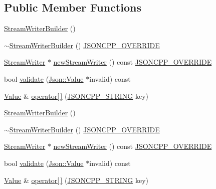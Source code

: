 \subsection*{Public Member Functions}
\begin{DoxyCompactItemize}
\item 
\hyperlink{class_json_1_1_stream_writer_builder_ab95b76179c152673ad14abc639a46ee4}{Stream\+Writer\+Builder} ()
\item 
\hyperlink{class_json_1_1_stream_writer_builder_a93263f8ef1e2d22593907075d8f0aaef}{$\sim$\+Stream\+Writer\+Builder} () \hyperlink{config_8h_a824d6199c91488107e443226fa6022c5}{J\+S\+O\+N\+C\+P\+P\+\_\+\+O\+V\+E\+R\+R\+I\+DE}
\item 
\hyperlink{class_json_1_1_stream_writer}{Stream\+Writer} $\ast$ \hyperlink{class_json_1_1_stream_writer_builder_ab9ee278609f88ae04a7c1a84e1f559e6}{new\+Stream\+Writer} () const \hyperlink{config_8h_a824d6199c91488107e443226fa6022c5}{J\+S\+O\+N\+C\+P\+P\+\_\+\+O\+V\+E\+R\+R\+I\+DE}
\item 
bool \hyperlink{class_json_1_1_stream_writer_builder_a12353b97766841db7d049da84658da09}{validate} (\hyperlink{class_json_1_1_value}{Json\+::\+Value} $\ast$invalid) const
\item 
\hyperlink{class_json_1_1_value}{Value} \& \hyperlink{class_json_1_1_stream_writer_builder_af68f6b59cb20b074052ed12bb3d336a3}{operator\mbox{[}$\,$\mbox{]}} (\hyperlink{config_8h_a1e723f95759de062585bc4a8fd3fa4be}{J\+S\+O\+N\+C\+P\+P\+\_\+\+S\+T\+R\+I\+NG} key)
\item 
\hyperlink{class_json_1_1_stream_writer_builder_ab95b76179c152673ad14abc639a46ee4}{Stream\+Writer\+Builder} ()
\item 
\hyperlink{class_json_1_1_stream_writer_builder_a93263f8ef1e2d22593907075d8f0aaef}{$\sim$\+Stream\+Writer\+Builder} () \hyperlink{config_8h_a824d6199c91488107e443226fa6022c5}{J\+S\+O\+N\+C\+P\+P\+\_\+\+O\+V\+E\+R\+R\+I\+DE}
\item 
\hyperlink{class_json_1_1_stream_writer}{Stream\+Writer} $\ast$ \hyperlink{class_json_1_1_stream_writer_builder_a7ed17f52a139202a7bebc85bc79cbca3}{new\+Stream\+Writer} () const \hyperlink{config_8h_a824d6199c91488107e443226fa6022c5}{J\+S\+O\+N\+C\+P\+P\+\_\+\+O\+V\+E\+R\+R\+I\+DE}
\item 
bool \hyperlink{class_json_1_1_stream_writer_builder_a12353b97766841db7d049da84658da09}{validate} (\hyperlink{class_json_1_1_value}{Json\+::\+Value} $\ast$invalid) const
\item 
\hyperlink{class_json_1_1_value}{Value} \& \hyperlink{class_json_1_1_stream_writer_builder_abce904d1b84cf8bda730824e3843decb}{operator\mbox{[}$\,$\mbox{]}} (\hyperlink{config_8h_a1e723f95759de062585bc4a8fd3fa4be}{J\+S\+O\+N\+C\+P\+P\+\_\+\+S\+T\+R\+I\+NG} key)
\end{DoxyCompactItemize}
